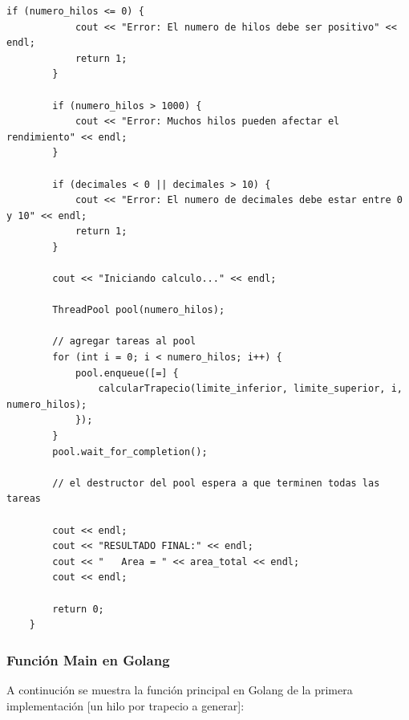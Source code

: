 \begin{lstlisting}[style=cpp-style, caption={Función Main en TrapecioPool.cpp }]
        if (numero_hilos <= 0) {
            cout << "Error: El numero de hilos debe ser positivo" << endl;
            return 1;
        }
        
        if (numero_hilos > 1000) {
            cout << "Error: Muchos hilos pueden afectar el rendimiento" << endl;
        }
    
        if (decimales < 0 || decimales > 10) {
            cout << "Error: El numero de decimales debe estar entre 0 y 10" << endl;
            return 1;
        }
        
        cout << "Iniciando calculo..." << endl;
        
        ThreadPool pool(numero_hilos);
        
        // agregar tareas al pool
        for (int i = 0; i < numero_hilos; i++) {
            pool.enqueue([=] {
                calcularTrapecio(limite_inferior, limite_superior, i, numero_hilos);
            });
        }
        pool.wait_for_completion();
        
        // el destructor del pool espera a que terminen todas las tareas
    
        cout << endl;
        cout << "RESULTADO FINAL:" << endl;
        cout << "   Area = " << area_total << endl;
        cout << endl;
        
        return 0;
    }
\end{lstlisting}

\subsubsection {Función Main en Golang}

A continución se muestra la función principal en Golang de la primera implementación [un hilo por trapecio a generar]:

